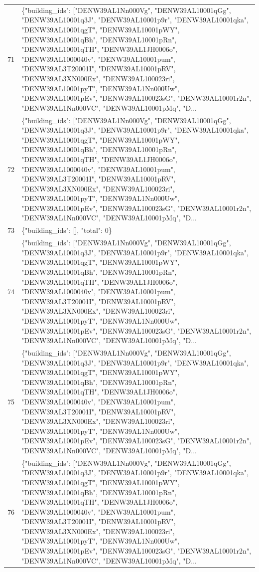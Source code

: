 \documentclass[a4paper,11pt]{article}
\begin{document}
\begin{table}[ht]
\begin{tabular}{r p{12cm}}
71 & \{"building\_ids": ["DENW39AL1Nn000Vg", "DENW39AL10001qGg", "DENW39AL10001q3J", "DENW39AL10001p9r", "DENW39AL10001qka", "DENW39AL10001qgT", "DENW39AL10001pWY", "DENW39AL10001qBh", "DENW39AL10001pRn", "DENW39AL10001qTH", "DENW39AL1JH0006o", "DENW39AL1000040v", "DENW39AL10001pum", "DENW39AL3T20001I", "DENW39AL10001pRV", "DENW39AL3XN000Ex", "DENW39AL100023ri", "DENW39AL10001pyT", "DENW39AL1Nn000Uw", "DENW39AL10001pEv", "DENW39AL100023sG", "DENW39AL10001r2n", "DENW39AL1Nn000VC", "DENW39AL10001pMq", "D... \\
72 & \{"building\_ids": ["DENW39AL1Nn000Vg", "DENW39AL10001qGg", "DENW39AL10001q3J", "DENW39AL10001p9r", "DENW39AL10001qka", "DENW39AL10001qgT", "DENW39AL10001pWY", "DENW39AL10001qBh", "DENW39AL10001pRn", "DENW39AL10001qTH", "DENW39AL1JH0006o", "DENW39AL1000040v", "DENW39AL10001pum", "DENW39AL3T20001I", "DENW39AL10001pRV", "DENW39AL3XN000Ex", "DENW39AL100023ri", "DENW39AL10001pyT", "DENW39AL1Nn000Uw", "DENW39AL10001pEv", "DENW39AL100023sG", "DENW39AL10001r2n", "DENW39AL1Nn000VC", "DENW39AL10001pMq", "D... \\
73 & \{"building\_ids": [], "total": 0\} \\
74 & \{"building\_ids": ["DENW39AL1Nn000Vg", "DENW39AL10001qGg", "DENW39AL10001q3J", "DENW39AL10001p9r", "DENW39AL10001qka", "DENW39AL10001qgT", "DENW39AL10001pWY", "DENW39AL10001qBh", "DENW39AL10001pRn", "DENW39AL10001qTH", "DENW39AL1JH0006o", "DENW39AL1000040v", "DENW39AL10001pum", "DENW39AL3T20001I", "DENW39AL10001pRV", "DENW39AL3XN000Ex", "DENW39AL100023ri", "DENW39AL10001pyT", "DENW39AL1Nn000Uw", "DENW39AL10001pEv", "DENW39AL100023sG", "DENW39AL10001r2n", "DENW39AL1Nn000VC", "DENW39AL10001pMq", "D... \\
75 & \{"building\_ids": ["DENW39AL1Nn000Vg", "DENW39AL10001qGg", "DENW39AL10001q3J", "DENW39AL10001p9r", "DENW39AL10001qka", "DENW39AL10001qgT", "DENW39AL10001pWY", "DENW39AL10001qBh", "DENW39AL10001pRn", "DENW39AL10001qTH", "DENW39AL1JH0006o", "DENW39AL1000040v", "DENW39AL10001pum", "DENW39AL3T20001I", "DENW39AL10001pRV", "DENW39AL3XN000Ex", "DENW39AL100023ri", "DENW39AL10001pyT", "DENW39AL1Nn000Uw", "DENW39AL10001pEv", "DENW39AL100023sG", "DENW39AL10001r2n", "DENW39AL1Nn000VC", "DENW39AL10001pMq", "D... \\
76 & \{"building\_ids": ["DENW39AL1Nn000Vg", "DENW39AL10001qGg", "DENW39AL10001q3J", "DENW39AL10001p9r", "DENW39AL10001qka", "DENW39AL10001qgT", "DENW39AL10001pWY", "DENW39AL10001qBh", "DENW39AL10001pRn", "DENW39AL10001qTH", "DENW39AL1JH0006o", "DENW39AL1000040v", "DENW39AL10001pum", "DENW39AL3T20001I", "DENW39AL10001pRV", "DENW39AL3XN000Ex", "DENW39AL100023ri", "DENW39AL10001pyT", "DENW39AL1Nn000Uw", "DENW39AL10001pEv", "DENW39AL100023sG", "DENW39AL10001r2n", "DENW39AL1Nn000VC", "DENW39AL10001pMq", "D... \\

\end{tabular}
\end{table}
\end{document}
